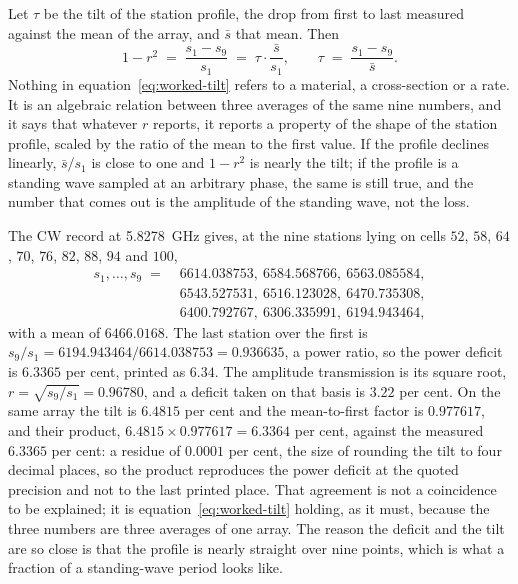 Let $\tau$ be the tilt of the station profile, the drop from first to last measured against the mean of the
array, and $\bar{s}$ that mean. Then
\begin{equation}
  1 - r^{2} \;=\; \frac{s_1 - s_9}{s_1} \;=\; \tau \cdot \frac{\bar{s}}{s_1} ,
  \qquad
  \tau \;=\; \frac{s_1 - s_9}{\bar{s}} .
  \label{eq:worked-tilt}
\end{equation}
Nothing in equation~\eqref{eq:worked-tilt} refers to a material, a cross-section or a rate. It is an algebraic
relation between three averages of the same nine numbers, and it says that whatever $r$ reports, it reports a
property of the shape of the station profile, scaled by the ratio of the mean to the first value. If the profile
declines linearly, $\bar{s}/s_1$ is close to one and $1 - r^2$ is nearly the tilt; if the profile is a standing
wave sampled at an arbitrary phase, the same is still true, and the number that comes out is the amplitude of
the standing wave, not the loss.

The CW record at \SI{5.8278}{\giga\hertz} gives, at the nine stations lying on cells
$52$, $58$, $64$, $70$, $76$, $82$, $88$, $94$ and $100$,
\begin{equation*}
  \begin{aligned}
    s_1, \dots, s_9 \;=\; {} & 6614.038753,\ 6584.568766,\ 6563.085584, \\
    & 6543.527531,\ 6516.123028,\ 6470.735308, \\
    & 6400.792767,\ 6306.335991,\ 6194.943464 ,
  \end{aligned}
\end{equation*}
with a mean of $6466.0168$. The last station over the first is $s_9/s_1 = 6194.943464/6614.038753 = 0.936635$, a
power ratio, so the power deficit is $6.3365$ per cent, printed as $6.34$. The amplitude transmission is its
square root, $r = \sqrt{s_9/s_1} = 0.96780$, and a deficit taken on that basis is $3.22$ per cent. On the same
array the tilt is $6.4815$ per cent and the mean-to-first factor is $0.977617$, and their product,
$6.4815 \times 0.977617 = 6.3364$ per cent, against the measured $6.3365$ per cent: a residue of $0.0001$
per cent, the size of rounding the tilt to four decimal places, so the product reproduces the power deficit
at the quoted precision and not to the last printed place. That agreement is not a coincidence to be
explained; it is equation~\eqref{eq:worked-tilt} holding, as it must, because the three numbers are three
averages of one array. The reason the deficit and the
tilt are so close is that the profile is nearly straight over nine points, which is what a fraction of a
standing-wave period looks like.


